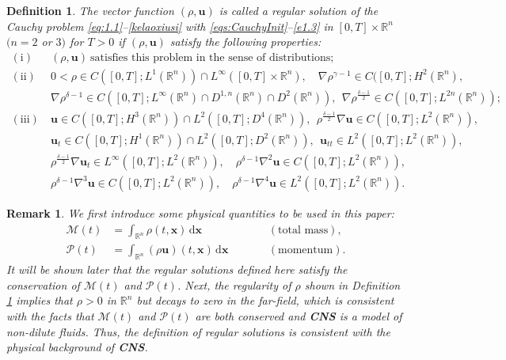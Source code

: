 \documentclass[11pt,reqno]{amsart}
\newtheorem{mydef}{Definition}
\newtheorem{rk}{Remark}
\numberwithin{rk}{section}
\numberwithin{prop}{section}
\numberwithin{mydef}{section}
\numberwithin{lem}{section}
\numberwithin{equation}{section}
\numberwithin{thm}{section}
\begin{document}
\begin{mydef}\label{cjk}
The vector function $(\rho, \boldsymbol{u})$ is called a regular solution of the Cauchy problem \eqref{eq:1.1}--\eqref{kelaoxiusi} with \eqref{eqs:CauchyInit}--\eqref{e1.3}  in $[0,T]\times \mathbb{R}^n$ $(n=2$ or $3)$ for $T>0$ if $(\rho,\boldsymbol{u})$ satisfy the following properties{\rm:}
\begin{equation*}\begin{aligned}
\mathrm{(i)}& \ (\rho, \boldsymbol{u}) \ \text{satisfies this problem in the sense of distributions};\\
\mathrm{(ii)}& \ 0<\rho\in C([0,T];L^1(\mathbb{R}^n))\cap L^\infty([0,T]\times\mathbb{R}^n), \quad \nabla \rho^{\gamma-1} \in C([0,T]; H^2(\mathbb{R}^n),\\
& \ \nabla\rho^{\delta-1}\in C([0,T];L^\infty(\mathbb{R}^n)\cap D^{1,n}(\mathbb{R}^n)\cap D^2(\mathbb{R}^n)),\ \ \nabla\rho^{\frac{\delta-1}{2}}\in C([0,T];L^{2n}(\mathbb{R}^n));\\[2pt]
\mathrm{(iii)}& \ \boldsymbol{u}\in C([0,T]; H^3(\mathbb{R}^n))\cap L^2([0,T]; D^{4}(\mathbb{R}^n)),\  \ \rho^\frac{\delta-1}{2}\nabla \boldsymbol{u} \in C([0,T]; L^2(\mathbb{R}^n)),\\[2pt]
&\ \boldsymbol{u}_t\in C([0,T]; H^1(\mathbb{R}^n))\cap L^2([0,T]; D^2(\mathbb{R}^n)),\ \ \boldsymbol{u}_{tt}\in L^2([0,T]; L^2(\mathbb{R}^n)),\\[2pt]  
& \ \rho^\frac{\delta-1}{2}\nabla \boldsymbol{u}_t \in  L^\infty([0,T];L^2(\mathbb{R}^n)),\quad  \rho^{\delta-1}\nabla^2 \boldsymbol{u} \in C([0,T]; L^2(\mathbb{R}^n)),\\[2pt] 
& \ \rho^{\delta-1}\nabla^3 \boldsymbol{u} \in C([0,T]; L^2(\mathbb{R}^n)),\quad \rho^{\delta-1}\nabla^4 \boldsymbol{u} \in L^2([0,T]; L^2(\mathbb{R}^n)).
\end{aligned}
\end{equation*}
\end{mydef}

\begin{rk}\label{regularsolution}
We first introduce some physical quantities to be used in this paper{\rm :}
\begin{equation*}
\begin{aligned}
\mathcal{M}(t)&=\int_{\mathbb{R}^n} \rho(t,\boldsymbol{x})\,\mathrm{d}\boldsymbol{x}&&\qquad (\textrm{total mass}),\\[2pt]
\mathcal{P}(t)&=\int_{\mathbb{R}^n} (\rho \boldsymbol{u})(t,\boldsymbol{x})\,\mathrm{d}\boldsymbol{x} &&\qquad (\textrm{momentum}). 
\end{aligned}
\end{equation*}
It will be shown later that the regular solutions defined here satisfy the conservation of $\mathcal{M}(t)$ and $\mathcal{P}(t)$. Next, the regularity of $\rho$ shown in {\rm Definition \ref{cjk}} 
implies that $\rho>0$ in $\mathbb{R}^n$ but decays to zero 
in the far-field, 
which is consistent with the facts 
that $\mathcal{M}(t)$ and $\mathcal{P}(t)$ are both conserved 
and {\rm\textbf{CNS}} is a model of non-dilute fluids. 
Thus, the definition of regular solutions is consistent with the physical background of {\rm\textbf{CNS}}.
\end{rk}
\end{document}

